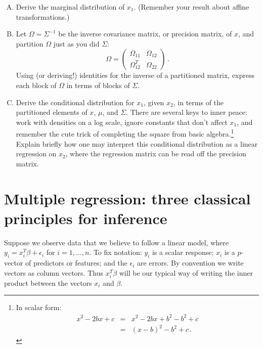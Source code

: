 \documentclass[11pt]{article}
\begin{document}
\begin{enumerate}[(A)]

\item Derive the marginal distribution of $x_1$. (Remember your result about affine transformations.)

\item Let $\Omega = \Sigma^{-1}$ be the inverse covariance matrix, or precision matrix, of $x$, and partition $\Omega$ just as you did $\Sigma$:
$$
\Omega =
\left(
\begin{array}{cc}
\Omega_{11} & \Omega_{12} \\
\Omega_{12}^T & \Omega_{22} 
\end{array}
\right) \, .
$$
Using (or deriving!) identities for the inverse of a partitioned matrix, express each block of $\Omega$ in terms of blocks of $\Sigma$.

\item Derive the conditional distribution for $x_1$, given $x_2$, in terms of the partitioned elements of $x$, $\mu$, and $\Sigma$.  There are several keys to inner peace: work with densities on a log scale, ignore constants that don't affect $x_1$, and remember the cute trick of completing the square from basic algebra.\footnote{In scalar form:
\begin{eqnarray*}
x^2 - 2bx + c &=& x^2 - 2bx + b^2 - b^2 + c \\
&=& (x-b)^2 - b^2 + c \, .
\end{eqnarray*}
}
Explain briefly how one may interpret this conditional distribution as a linear regression on $x_2$, where the regression matrix can be read off the precision matrix.

\end{enumerate}


\section{Multiple regression: three classical principles for inference}

Suppose we observe data that we believe to follow a linear model, where $y_i = x_i^T \beta + \epsilon_i$ for $i = 1, \ldots, n$.
To fix notation: $y_i$ is a scalar response; $x_i$ is a $p$-vector of predictors or features; and the $\epsilon_i$ are errors.  By convention we write vectors as column vectors.  Thus $x_i^T \beta$ will be our typical way of writing the inner product between the vectors $x_i$ and $\beta$.
\end{document}
